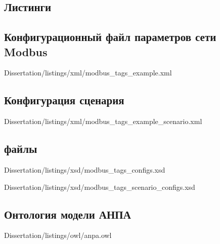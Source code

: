 \begin{landscape}
\chapter{Листинги}
\section{Конфигурационный файл параметров сети Modbus}\label{app:sec:modbus_tag}
    
            {Dissertation/listings/xml/modbus_tags_example.xml}
\end{landscape}

\section{Конфигурация сценария}\label{app:sec:modbus_scenario_example_diagram}

        {Dissertation/listings/xml/modbus_tags_example_scenario.xml}

\begin{landscape}
\section{ файлы}\label{app:sec:xsd}
    
            {Dissertation/listings/xsd/modbus_tags_configs.xsd}
    
    
            {Dissertation/listings/xsd/modbus_tags_scenario_configs.xsd}        
\end{landscape}

\begin{landscape}
    \section{Онтология модели АНПА}\label{app:sec:anpa_owl}
    
            {Dissertation/listings/owl/anpa.owl}
\end{landscape}


